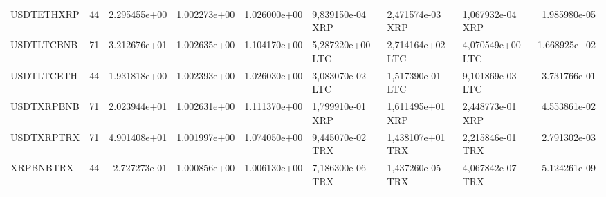 \begin{tabular}{lrrrrlllr}
 USDTETHXRP &    44 &   2.295455e+00 &   1.002273e+00 &    1.026000e+00 &  9,839150e-04 XRP &   2,471574e-03 XRP &           1,067932e-04 XRP &                      1.985980e-05 \\
 USDTLTCBNB &    71 &   3.212676e+01 &   1.002635e+00 &    1.104170e+00 &  5,287220e+00 LTC &   2,714164e+02 LTC &           4,070549e+00 LTC &                      1.668925e+02 \\
 USDTLTCETH &    44 &   1.931818e+00 &   1.002393e+00 &    1.026030e+00 &  3,083070e-02 LTC &   1,517390e-01 LTC &           9,101869e-03 LTC &                      3.731766e-01 \\
 USDTXRPBNB &    71 &   2.023944e+01 &   1.002631e+00 &    1.111370e+00 &  1,799910e-01 XRP &   1,611495e+01 XRP &           2,448773e-01 XRP &                      4.553861e-02 \\
 USDTXRPTRX &    71 &   4.901408e+01 &   1.001997e+00 &    1.074050e+00 &  9,445070e-02 TRX &   1,438107e+01 TRX &           2,215846e-01 TRX &                      2.791302e-03 \\
  XRPBNBTRX &    44 &   2.727273e-01 &   1.000856e+00 &    1.006130e+00 &  7,186300e-06 TRX &   1,437260e-05 TRX &           4,067842e-07 TRX &                      5.124261e-09 \\
\bottomrule
\end{tabular}
